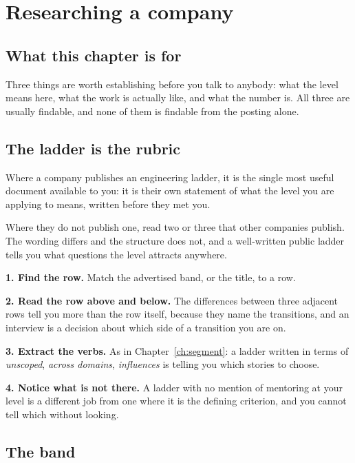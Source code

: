 \chapter{Researching a company}
\label{ch:company}

\section*{What this chapter is for}

Three things are worth establishing before you talk to anybody: what the level
means here, what the work is actually like, and what the number is. All three
are usually findable, and none of them is findable from the posting alone.

\section{The ladder is the rubric}

Where a company publishes an engineering ladder, it is the single most useful
document available to you: it is their own statement of what the level you are
applying to means, written before they met you.

Where they do not publish one, read two or three that other companies
publish. The wording differs and the structure does
not, and a well-written public ladder tells you what questions the level
attracts anywhere.

\begin{kitmethod}
\textbf{1. Find the row.} Match the advertised band, or the title, to a row.

\textbf{2. Read the row above and below.} The differences between three
adjacent rows tell you more than the row itself, because they name the
transitions, and an interview is a decision about which side of a transition
you are on.

\textbf{3. Extract the verbs.} As in Chapter~\ref{ch:segment}: a ladder written
in terms of \emph{unscoped}, \emph{across domains}, \emph{influences} is
telling you which stories to choose.

\textbf{4. Notice what is not there.} A ladder with no mention of mentoring at
your level is a different job from one where it is the defining criterion, and
you cannot tell which without looking.
\end{kitmethod}

\section{The band}

